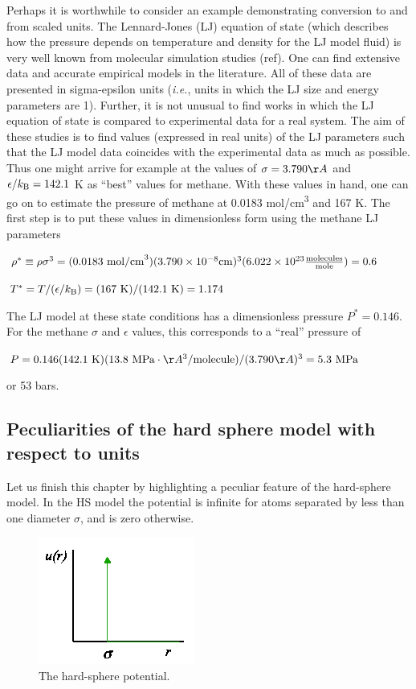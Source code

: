 \documentclass[9pt,bestpractices]{molsim}
\begin{document}
Perhaps it is worthwhile to consider an example demonstrating conversion
to and from scaled units. The Lennard-Jones (LJ) equation of state (which describes how
the pressure depends on temperature and density for the LJ model fluid)
is very well known from molecular simulation studies (ref). One can find
extensive data and accurate empirical models in the literature. All of
these data are presented in sigma-epsilon units (\emph{i.e.}, units in
which the LJ size and energy parameters are 1). Further, it is not
unusual to find works in which the LJ equation of state is compared to
experimental data for a real system. The aim of these studies is to find
values (expressed in real units) of the LJ parameters such that the LJ
model data coincides with the experimental data as much as possible.
Thus one might arrive for example at the values of $\sigma = 3.790\AA$ and $\epsilon/k_{\rm B} =
142.1$ K as ``best'' values for methane. With
these values in hand, one can go on to estimate the pressure of methane
at 0.0183 mol/cm\textsuperscript{3} and 167 K. The first step is to put
these values in dimensionless form using the methane LJ parameters

$\rho^* \equiv \rho\sigma^3 = (0.0183~{\rm mol/cm}^3)(3.790 \times
10^{-8} {\rm cm})^3(6.022 \times 10^{23} \frac{{\rm molecules}}{{\rm mole}}) = 0.6$

$T^* = T/(\epsilon/k_{\rm B}) = (167~{\rm K})/(142.1~{\rm K}) = 1.174$

The LJ model at these state conditions has a dimensionless pressure $P^* =
0.146$. For the methane $\sigma$ and $\epsilon$ values, this corresponds to a ``real''
pressure of

$P = 0.146 (142.1~{\rm K})(13.8~{\rm MPa}\cdot\AA^{3}/{\rm molecule})/(3.790\AA)^{3} = 5.3~{\rm MPa}$

or 53 bars.

\subsection{Peculiarities of the hard sphere model with respect to units}

Let us finish this chapter by highlighting a peculiar feature of the
hard-sphere model. In the HS model the potential is infinite for atoms
separated by less than one diameter $\sigma$, and is zero otherwise.

\begin{figure}
  \centering
  \includegraphics[width=5 cm]{SimElements_figures/image001}
  \caption{\label{fig:HS} The hard-sphere potential.}
\end{figure}
\end{document}

